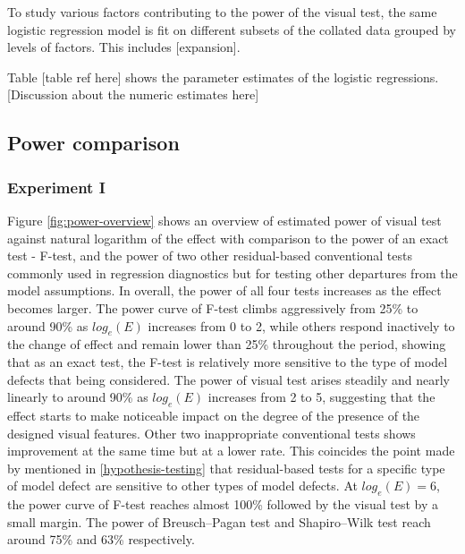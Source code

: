 \documentclass[]{interact}
\theoremstyle{plain}%
\theoremstyle{definition}
\theoremstyle{remark}
\begin{document}
To study various factors contributing to the power of the visual test,
the same logistic regression model is fit on different subsets of the
collated data grouped by levels of factors. This includes
{[}expansion{]}.

Table {[}table ref here{]} shows the parameter estimates of the logistic
regressions. {[}Discussion about the numeric estimates here{]}

\hypertarget{power-comparison}{%
\subsection{Power comparison}\label{power-comparison}}

\hypertarget{experiment-i}{%
\subsubsection{Experiment I}\label{experiment-i}}

Figure \ref{fig:power-overview} shows an overview of estimated power of
visual test against natural logarithm of the effect with comparison to
the power of an exact test - F-test, and the power of two other
residual-based conventional tests commonly used in regression
diagnostics but for testing other departures from the model assumptions.
In overall, the power of all four tests increases as the effect becomes
larger. The power curve of F-test climbs aggressively from 25\% to
around 90\% as \(log_e(E)\) increases from 0 to 2, while others respond
inactively to the change of effect and remain lower than 25\% throughout
the period, showing that as an exact test, the F-test is relatively more
sensitive to the type of model defects that being considered. The power
of visual test arises steadily and nearly linearly to around 90\% as
\(log_e(E)\) increases from 2 to 5, suggesting that the effect starts to
make noticeable impact on the degree of the presence of the designed
visual features. Other two inappropriate conventional tests shows
improvement at the same time but at a lower rate. This coincides the
point made by \citet{cook1982residuals} mentioned in
\ref{hypothesis-testing} that residual-based tests for a specific type
of model defect are sensitive to other types of model defects. At
\(log_e(E) = 6\), the power curve of F-test reaches almost 100\%
followed by the visual test by a small margin. The power of
Breusch--Pagan test and Shapiro--Wilk test reach around 75\% and 63\%
respectively.
\end{document}

